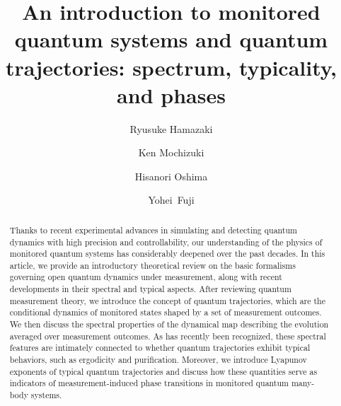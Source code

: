 \documentclass[preprint,pteplogo]{ptephy_v2}%
\numberwithin{equation}{section}
\theoremstyle{definition}
\begin{document}
\title{An introduction to monitored quantum systems and quantum trajectories: spectrum, typicality, and phases}



\author[1,2,*]{Ryusuke Hamazaki}
\author[3,1]{Ken Mochizuki}
\author[3,1]{Hisanori Oshima}
\author[3]{Yohei~Fuji}



\begin{abstract}%
Thanks to recent experimental advances in simulating and detecting quantum dynamics with high precision and controllability, our understanding of the physics of monitored quantum systems has considerably deepened over the past decades.
In this article, we provide an introductory theoretical review on the basic formalisms governing open quantum dynamics under measurement, along with recent developments in their spectral and typical aspects.
After reviewing quantum measurement theory, we
introduce the concept of quantum trajectories, which are the conditional dynamics of monitored states shaped by a set of measurement outcomes.
We then discuss the spectral properties of the dynamical map describing the evolution averaged over measurement outcomes.
As has recently been recognized, these spectral features are intimately connected to whether quantum trajectories exhibit typical behaviors, such as ergodicity and purification.
Moreover, we introduce Lyapunov exponents of typical quantum trajectories and discuss how these quantities serve as indicators of measurement-induced phase transitions in monitored quantum many-body systems.



\end{abstract}

\end{document}
